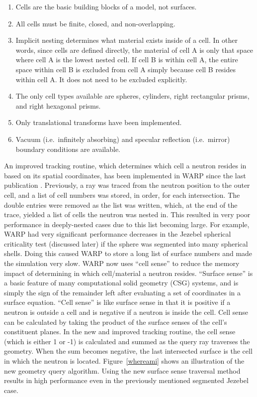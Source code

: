 \documentclass[preprint,12pt]{elsarticle}
\begin{document}
\begin{enumerate}
\item Cells are the basic building blocks of a model, not surfaces.
\item All cells must be finite, closed, and non-overlapping.
\item Implicit nesting determines what material exists inside of a cell.  In other words, since cells are defined directly, the material of cell A is only that space where cell A is the lowest nested cell.  If cell B is within cell A, the entire space within cell B is excluded from cell A simply because cell B resides within cell A.  It does not need to be excluded explicitly.
\item The only cell types available are spheres, cylinders, right rectangular prisms, and right hexagonal prisms.
\item Only translational transforms have been implemented.
\item Vacuum (i.e.\ infinitely absorbing) and specular reflection  (i.e.\ mirror) boundary conditions are available.
\end{enumerate}

An improved tracking routine, which determines which cell a neutron resides in based on its spatial coordinates, has been implemented in WARP since the last publication \cite{algorithms}.  Previously, a ray was traced from the neutron position to the outer cell, and a list of cell numbers was stored, in order, for each intersection.  The double entries were removed as the list was written, which, at the end of the trace, yielded a list of cells the neutron was nested in.  This resulted in very poor performance in deeply-nested cases due to this list becoming large.  For example, WARP had very significant performance decreases in the Jezebel spherical criticality test (discussed later) if the sphere was segmented into many spherical shells.  Doing this caused WARP to store a long list of surface numbers and made the simulation very slow.  
WARP now uses ``cell sense'' to reduce the memory impact of determining in which cell/material a neutron resides.  ``Surface sense'' is a basic feature of many computational solid geometry (CSG) systems, and is simply the sign of the remainder left after evaluating a set of coordinates in a surface equation. ``Cell sense'' is like surface sense in that it is positive if a neutron is outside a cell and is negative if a neutron is inside the cell.  Cell sense can be calculated by taking the product of the surface senses of the cell's constituent planes.  In the new and improved tracking routine, the cell sense (which is either 1 or -1) is calculated and summed as the query ray traverses the geometry.  When the sum becomes negative, the last intersected surface is the cell in which the neutron is located.   Figure~\ref{whereami} shows an illustration of the new geometry query algorithm.  Using the new surface sense traversal method results in high performance even in the previously mentioned segmented Jezebel case.
\end{document}
